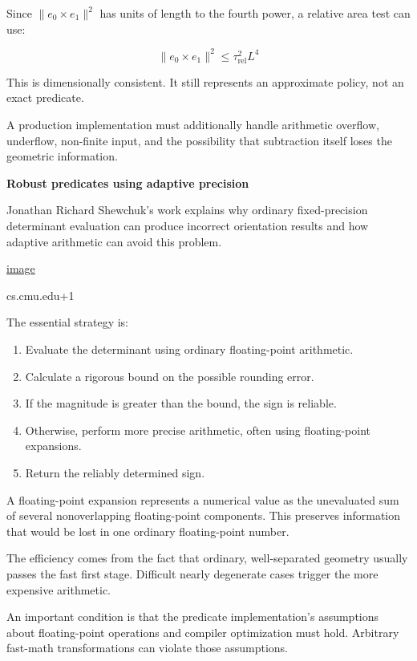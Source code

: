 Since \(\|e_0\times e_1\|^2\) has units of length to the fourth power, a relative area test can use:

\[
\|e_0\times e_1\|^2 \le \tau_{\mathrm{rel}}^2L^4
\]

This is dimensionally consistent. It still represents an approximate policy, not an exact predicate.

A production implementation must additionally handle arithmetic overflow, underflow, non-finite input, and the possibility that subtraction itself loses the geometric information.

\textbf{Robust predicates using adaptive precision}

Jonathan Richard Shewchuk's work explains why ordinary fixed-precision determinant evaluation can produce incorrect orientation results and how adaptive arithmetic can avoid this problem. 

\href{https://www.google.com/s2/favicons?domain=https://www.cs.cmu.edu&sz=32}{image}

cs.cmu.edu+1

The essential strategy is:

\begin{enumerate}
\def\labelenumi{\arabic{enumi}.}
\tightlist
\item
  Evaluate the determinant using ordinary floating-point arithmetic.
\item
  Calculate a rigorous bound on the possible rounding error.
\item
  If the magnitude is greater than the bound, the sign is reliable.
\item
  Otherwise, perform more precise arithmetic, often using floating-point expansions.
\item
  Return the reliably determined sign.
\end{enumerate}

A floating-point expansion represents a numerical value as the unevaluated sum of several nonoverlapping floating-point components. This preserves information that would be lost in one ordinary floating-point number.

The efficiency comes from the fact that ordinary, well-separated geometry usually passes the fast first stage. Difficult nearly degenerate cases trigger the more expensive arithmetic.

An important condition is that the predicate implementation's assumptions about floating-point operations and compiler optimization must hold. Arbitrary fast-math transformations can violate those assumptions.

